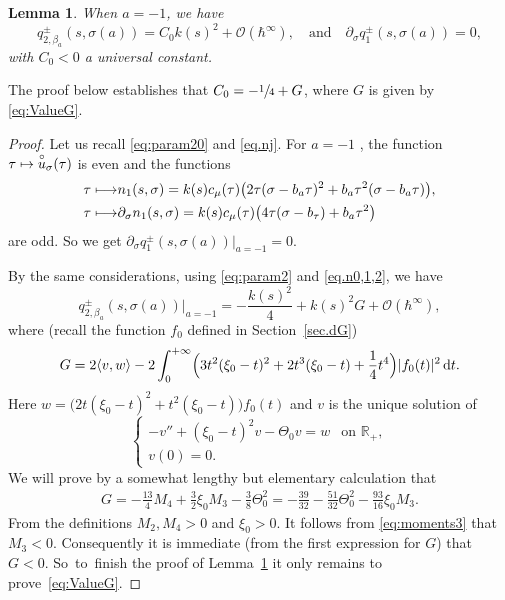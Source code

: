 \documentclass[10pt]{amsart}
\newcommand\mto{\mathchoice{\longmapsto}{\mapsto}{\mapsto}{\mapsto}}
\newcommand{\rd}{\,\mathrm{d}}
\theoremstyle{plain}
\newtheorem{lemma}[theorem]{Lemma}
\theoremstyle{definition}
\newcommand{\R}{\mathbb{R}}
\begin{document}
\begin{lemma}\label{lem.a=-1}
When $a=-1$, we have
\[
q_{2,\beta_a}^\pm(s,\sigma(a))=C_0 k(s)^2 +\mathscr O(\hbar^{\infty}),\quad\text{and}\quad \partial_\sigma q_1^\pm(s,\sigma(a))=0,
\]
with $C_0<0$ a universal constant.
\end{lemma}

The proof below establishes that $C_0 = -\sfrac{1}{4} + G$, where $G$ is given by \eqref{eq:ValueG}.

\begin{proof}
Let us recall \eqref{eq:param20} and \eqref{eq.nj}.
For $a=-1$ , the function $\tau\mto \overset{\circ}{u}_{\sigma}(\tau)$ is even and the functions
\[
\begin{aligned}
\tau\mto &n_1(s,\sigma)=k(s)c_\mu(\tau)\bigl(2\tau(\sigma-b_a\tau)^2+b_a\tau^2(\sigma-b_a\tau)\bigr),\\
\tau\mto & \partial_\sigma n_1(s,\sigma)=k(s)c_\mu(\tau)\bigl(4\tau(\sigma-b_\tau)+b_a\tau^2\bigr)
\end{aligned}
\]
are odd. So we get $\partial_\sigma q^\pm_1(s,\sigma(a))|_{a=-1}=0$.

By the same considerations, using \eqref{eq:param2} and \eqref{eq.n0,1,2}, we have
\[
q_{2,\beta_a}^\pm(s,\sigma(a))|_{a=-1}=-\frac{k(s)^2}{4}+k(s)^2G +\mathscr O(\hbar^{\infty}),
\]
where (recall the function $f_0$ defined in Section~\ref{sec.dG})
\begin{equation}\label{eq.G}
G=2\langle v,w\rangle -2\int_0^{+\infty} \Bigl(3t^2(\xi_0-t)^2+2t^3(\xi_0-t)+\frac14t^4\Bigr)|f_0(t)|^2\rd t.
\end{equation}
Here $w=\bigl(2t(\xi_0-t)^2+t^2(\xi_0-t)\bigr)f_0(t)$ and $v$ is the unique solution of
\[
\begin{cases}\label{eq.f=Rw}
-v''+(\xi_0-t)^2v -\Theta_0 v=w&\text{on~}\R_+,\\
v(0)=0.
\end{cases}
\]
We will prove by a somewhat lengthy but elementary calculation that 
\begin{align}\label{eq:ValueG}
G=-\frac{13}{4}M_4+\frac32\xi_0M_3-\frac{3}{8}\Theta_0^2=-\frac{39}{32}-\frac{51}{32}\Theta_0^2-\frac{93}{16}\xi_0M_3.
\end{align}
From the definitions $M_2, M_4>0$ and $\xi_0>0$. It follows from \eqref{eq:moments3} that $M_3<0$. Consequently it is immediate (from the first expression for $G$) that $G<0$. So~to~finish the proof of Lemma~\ref{lem.a=-1} it only remains to prove~\eqref{eq:ValueG}.


\end{proof}
\end{document}
